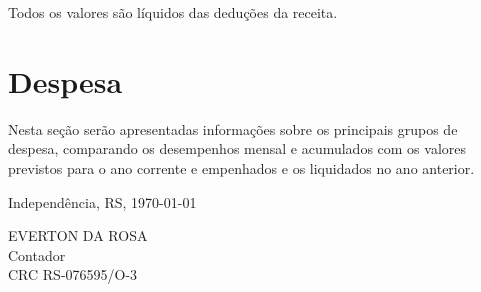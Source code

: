 \documentclass[12pt, a4paper]{report}
\begin{document}
Todos os valores são líquidos das deduções da receita.














\section{Despesa}

Nesta seção serão apresentadas informações sobre os principais grupos de despesa, comparando os desempenhos mensal e acumulados com os valores previstos para o ano corrente e empenhados e os liquidados no ano anterior.





\vspace{16pt}

\begin{center}
	Independência, RS, \today
\end{center}

\vspace{36pt}

\begin{center}
	EVERTON DA ROSA\\
	Contador\\
	CRC RS-076595/O-3
\end{center}
\end{document}
